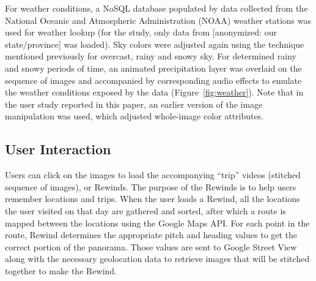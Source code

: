 \documentclass{sigchi}
\begin{document}
For weather conditions, a NoSQL database populated by data collected from the National Oceanic and Atmospheric Administration (NOAA) weather stations was used for weather lookup (for the study, only data from [anonymized: our state/province] was loaded). Sky colors were adjusted again using the technique mentioned previously for overcast, rainy and snowy sky. For determined rainy and snowy periods of time, an animated precipitation layer was overlaid on the sequence of images and accompanied by corresponding audio effects to emulate the weather conditions exposed by the data (Figure~\ref{fig:weather}). Note that in the user study reported in this paper, an earlier version of the image manipulation was used, which adjusted whole-image color attributes.


\subsection{User Interaction}
Users can click on the images to load the accompanying ``trip'' videos (stitched sequence of images), or Rewinds. The purpose of the Rewinds is to help users remember locations and trips.
When the user loads a Rewind, all the locations the user visited on that day are gathered and sorted, after which a route is mapped between the locations using the Google Maps API.
For each point in the route, Rewind determines the appropriate pitch and heading values to get the correct portion of the panorama. Those values are sent to Google Street View along with the necessary geolocation data to retrieve images that will be stitched together to make the Rewind.
\end{document}
